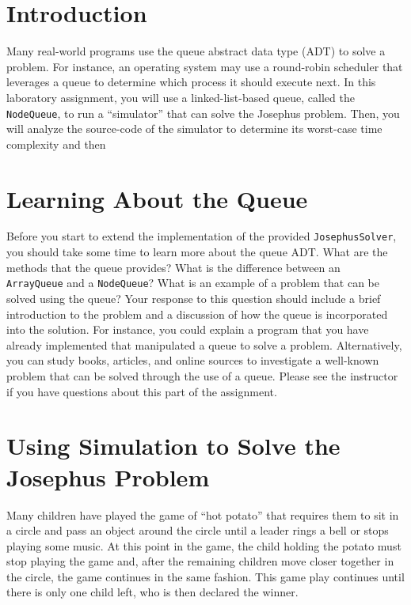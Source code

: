 


\usepackage[compact]{titlesec}


\section*{Introduction}

  Many real-world programs use the queue abstract data type (ADT) to solve a problem.  For instance, an operating system
  may use a round-robin scheduler that leverages a queue to determine which process it should execute next. In this
  laboratory assignment, you will use a linked-list-based queue, called the {\tt NodeQueue}, to run a ``simulator'' that
  can solve the Josephus problem. Then, you will analyze the source-code of the simulator to determine its worst-case
  time complexity and then  

\section*{Learning About the Queue}

  Before you start to extend the implementation of the provided {\tt JosephusSolver}, you should take some time to learn
  more about the queue ADT.  What are the methods that the queue provides?  What is the difference between an {\tt
    ArrayQueue} and a {\tt NodeQueue}? What is an example of a problem that can be solved using the queue? Your response
  to this question should include a brief introduction to the problem and a discussion of how the queue is incorporated
  into the solution. For instance, you could explain a program that you have already implemented that manipulated a
  queue to solve a problem.  Alternatively, you can study books, articles, and online sources to investigate a
  well-known problem that can be solved through the use of a queue.  Please see the instructor if you have questions
  about this part of the assignment.

\section*{Using Simulation to Solve the Josephus Problem}

  Many children have played the game of ``hot potato'' that requires them to sit in a circle and pass an object around
  the circle until a leader rings a bell or stops playing some music.  At this point in the game, the child holding the
  potato must stop playing the game and, after the remaining children move closer together in the circle, the game
  continues in the same fashion. This game play continues until there is only one child left, who is then declared the
  winner.

